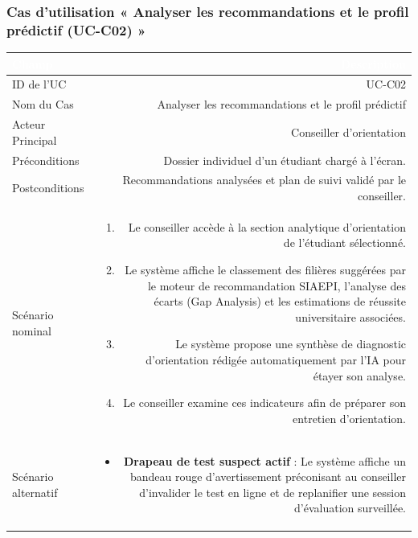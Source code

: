 \vspace{1em}

\subsubsection*{Cas d'utilisation « Analyser les recommandations et le profil prédictif (UC-C02) »}

\noindent
\begin{tabular}{|L|R|}
\hline
{}\textcolor{white}{\textbf{Champ}} & \textcolor{white}{\textbf{Description}} \\
\hline
{}ID de l'UC & UC-C02 \\
\hline
Nom du Cas & Analyser les recommandations et le profil prédictif \\
\hline
{}Acteur Principal & Conseiller d'orientation \\
\hline
Préconditions & Dossier individuel d'un étudiant chargé à l'écran. \\
\hline
{}Postconditions & Recommandations analysées et plan de suivi validé par le conseiller. \\
\hline
Scénario nominal &
\begin{enumerate}
  \item Le conseiller accède à la section analytique d'orientation de l'étudiant sélectionné.
  \item Le système affiche le classement des filières suggérées par le moteur de recommandation SIAEPI, l'analyse des écarts (Gap Analysis) et les estimations de réussite universitaire associées.
  \item Le système propose une synthèse de diagnostic d'orientation rédigée automatiquement par l'IA pour étayer son analyse.
  \item Le conseiller examine ces indicateurs afin de préparer son entretien d'orientation.
\end{enumerate} \\
\hline
{}Scénario alternatif &
\begin{itemize}
  \item \textbf{Drapeau de test suspect actif} : Le système affiche un bandeau rouge d'avertissement préconisant au conseiller d'invalider le test en ligne et de replanifier une session d'évaluation surveillée.
\end{itemize} \\
\hline
\end{tabular}

